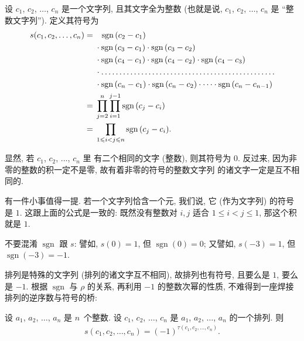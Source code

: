 \documentclass[%
    UTF8,%
    fontset=none,%
    punct=kaiming,%
    zihao=-4,%
    a4paper,%
    oneside,%
]{ctexbook}
\let\emph\relax
\renewcommand*{\leq}{\leqslant}
\begin{document}
\begin{definition}[整数文字列的符号]
    设 \(c_1\), \(c_2\), \(\dots\), \(c_n\) 是一个文字列,
    且其文字全为整数
    (也就是说, \(c_1\), \(c_2\), \(\dots\), \(c_n\) 是
    ``整数文字列'').
    定义其符号为
    \begin{align*}
        s(c_1, c_2, \dots, c_n)
        = {} & \hphantom{\cdot\,\,}
        \operatorname{sgn} {(c_2 - c_1)}
        \\
             & \cdot \operatorname{sgn} {(c_3 - c_1)}
        \cdot \operatorname{sgn} {(c_3 - c_2)}
        \\
             & \cdot \operatorname{sgn} {(c_4 - c_1)}
        \cdot \operatorname{sgn} {(c_4 - c_2)}
        \cdot \operatorname{sgn} {(c_4 - c_3)}
        \\
             & \cdot
        \dots \dots \dots \dots
        \dots \dots \dots \dots
        \dots \dots \dots \dots
        \dots \dots \dots \dots
        \\
             & \cdot \operatorname{sgn} {(c_n - c_1)}
        \cdot \operatorname{sgn} {(c_n - c_2)} \cdot \dots
        \cdot \operatorname{sgn} {(c_n - c_{n-1})}
        \\
        = {} & \prod_{j = 2}^{n} {
        \prod_{i = 1}^{j - 1} {\operatorname{sgn} {(c_j - c_i)}} }
        \\
        = {} & \prod_{1 \leq i < j \leq n}
        {\operatorname{sgn} {(c_j - c_i)}}.
    \end{align*}
\end{definition}

显然, 若 \(c_1\), \(c_2\), \(\dots\), \(c_n\) 里%
有二个相同的文字 (整数),
则其符号为 \(0\).
反过来, 因为非零的整数的积一定不是零,
故有着非零的符号的整数文字列%
的诸文字一定是互不相同的.

有一件小事值得一提.
若一个文字列恰含一个元,
我们说, 它 (作为文字列) 的符号是 \(1\).
这跟上面的公式是一致的:
既然没有整数对 \(i, j\) 适合 \(1 \leq i < j \leq 1\),
那这个积就是 \(1\).

不要混淆 \(\operatorname{sgn}\) 跟 \(s\):
譬如, \(s(0) = 1\), 但 \(\operatorname{sgn} {(0)} = 0\);
又譬如, \(s(-3) = 1\), 但 \(\operatorname{sgn} {(-3)} = -1\).

排列是特殊的文字列
(排列的诸文字互不相同),
故排列也有符号,
且要么是 \(1\), 要么是 \(-1\).
根据 \(\operatorname{sgn}\) 与 \(\rho\) 的关系,
再利用 \(-1\) 的整数次幂的性质,
不难得到一座焊接排列的逆序数与符号的桥:

\begin{theorem}
    设 \(a_1\), \(a_2\), \(\dots\), \(a_n\) 是%
    \emph{互不相同的} \(n\)~个整数.
    设
    \(c_1\), \(c_2\), \(\dots\), \(c_n\)
    是 \(a_1\), \(a_2\), \(\dots\), \(a_n\) 的一个排列.
    则
    \begin{align*}
        s(c_1, c_2, \dots, c_n)
        = (-1)^{\tau(c_1, c_2, \dots, c_n)}.
    \end{align*}
\end{theorem}
\end{document}
